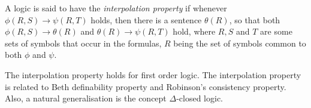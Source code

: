 \documentclass[12pt]{article}
\begin{document}
A logic is said to have the \emph{interpolation property} if whenever $\phi(R,S) \rightarrow \psi(R,T)$ holds, then there is a sentence $\theta(R)$, so that both $\phi(R,S) \rightarrow \theta(R)$ and $\theta(R) \rightarrow \psi(R,T)$ hold, where $R,S$ and $T$ are some sets of symbols that occur in the formulas, $R$ being the set of symbols common to both $\phi$ and $\psi$.

The interpolation property holds for first order logic. The interpolation property is related to Beth definability property and Robinson's consistency property. Also, a natural generalisation is the concept $\Delta$-closed logic.
\end{document}
